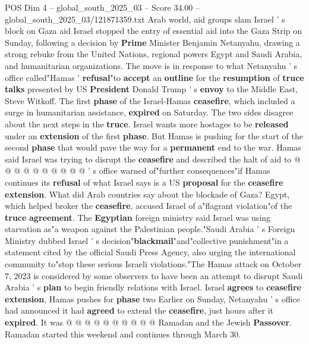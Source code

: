 \begin{textsample}{POS Dim 4 – global\_south\_2025\_03 – Score 34.00 – global\_south\_2025\_03/121871359.txt}  \label{ex:f4_pos_033}
Arab world, aid groups slam Israel ' s block on Gaza aid Israel stopped the entry of essential aid into the Gaza Strip on Sunday, following a decision by \textbf{Prime} Minister Benjamin Netanyahu, drawing a strong rebuke from the United Nations, regional powers Egypt and Saudi Arabia, and humanitarian organizations.
The move is in response to what Netanyahu ' s office called"Hamas ' \textbf{refusal}"to \textbf{accept} an \textbf{outline} for the \textbf{resumption} of \textbf{truce} \textbf{talks} presented by US \textbf{President} Donald Trump ' s \textbf{envoy} to the Middle East, Steve Witkoff.
The first \textbf{phase} of the Israel-Hamas \textbf{ceasefire}, which included a surge in humanitarian assistance, \textbf{expired} on Saturday.
The two sides disagree about the next steps in the \textbf{truce}.
Israel wants more hostages to be \textbf{released} under an \textbf{extension} of the first \textbf{phase}.
But Hamas is pushing for the start of the second \textbf{phase} that would pave the way for a \textbf{permanent} end to the war.
Hamas said Israel was trying to disrupt the \textbf{ceasefire} and described the halt of aid to @ @ @ @ @ @ @ @ @ @ ' s office warned of"further consequences"if Hamas continues its \textbf{refusal} of what Israel says is a US \textbf{proposal} for the \textbf{ceasefire} \textbf{extension}.
What did Arab countries say about the blockade of Gaza?
Egypt, which helped broker the \textbf{ceasefire}, accused Israel of a"flagrant violation"of the \textbf{truce} \textbf{agreement}.
The \textbf{Egyptian} foreign ministry said Israel was using starvation as"a weapon against the Palestinian people."Saudi Arabia ' s Foreign Ministry dubbed Israel ' s decision"\textbf{blackmail}"and"collective punishment"in a statement cited by the official Saudi Press Agency, also urging the international community to"stop these serious Israeli violations."The Hamas attack on October 7, 2023 is considered by some observers to have been an attempt to disrupt Saudi Arabia ' s \textbf{plan} to begin friendly relations with Israel.
Israel \textbf{agrees} to \textbf{ceasefire} \textbf{extension}, Hamas pushes for \textbf{phase} two Earlier on Sunday, Netanyahu ' s office had announced it had \textbf{agreed} to extend the \textbf{ceasefire}, just hours after it \textbf{expired}.
It was @ @ @ @ @ @ @ @ @ @ Ramadan and the Jewish \textbf{Passover}.
Ramadan started this weekend and continues through March 30.

\end{textsample}

